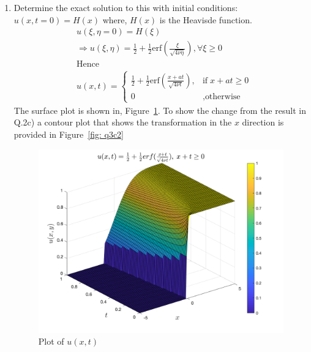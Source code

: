 \documentclass[11pt]{article}
\begin{document}
\begin{enumerate}
\begin{enumerate}[label = (\alph*)]
\item{\color{blue}Determine the exact solution to this with initial conditions:} $u(x,t=0) = H(x)$ where, $H(x)$ is the Heavisde function. 
\begin{align*}
& u(\xi,\eta = 0) = H(\xi) \\
&  \Rightarrow u(\xi,\eta) = \frac{1}{2} + \frac{1}{2} \text{erf}\left(\frac{\xi}{\sqrt{4\nu \eta}}\right), \forall \xi \geq 0\\
& \text{Hence} \\
& u(x,t) = 
\begin{cases}
\frac{1}{2} + \frac{1}{2} \text{erf}\left(\frac{x+at}{\sqrt{4\nu t}}\right), & \text{if}\;  x+at \geq 0 \\
0 &, \text{otherwise}
\end{cases}
\end{align*} 
The surface plot is shown in, Figure~\ref{fig: q3c}. To show the change from the result in Q.2c) a contour plot that shows the transformation in the $x$ direction is provided in Figure~\ref{fig: q3c2}
\begin{figure}[htp]
\begin{center}
\includegraphics[width = 5in]{q3c}
\caption{Plot of $u(x,t)$}
\label{fig: q3c}
\end{center}
\end{figure}


\end{enumerate}
\end{enumerate}
\end{document}

